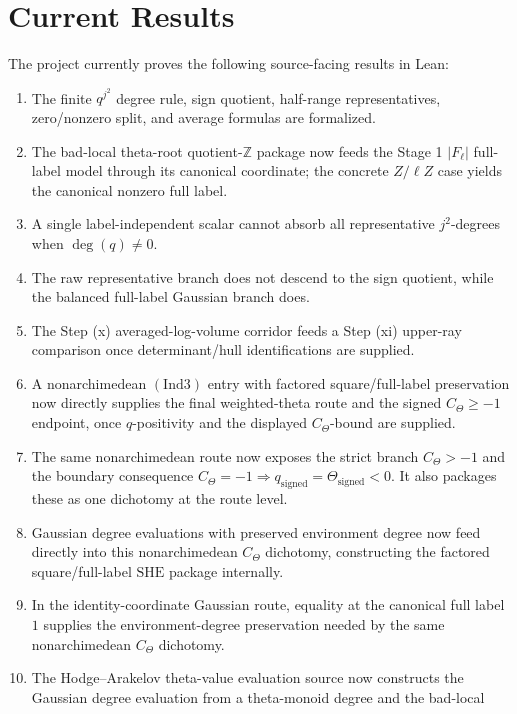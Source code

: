 \documentclass[11pt]{article}
\newcommand{\Lean}{Lean}
\newcommand{\Ind}{\ensuremath{\mathrm{Ind}}}
\newcommand{\SHE}{\ensuremath{\mathrm{SHE}}}
\theoremstyle{plain}
\theoremstyle{definition}
\theoremstyle{remark}
\begin{document}
\section{Current Results}

The project currently proves the following source-facing results in \Lean{}:

\begin{enumerate}
\item The finite \(q^{j^2}\) degree rule, sign quotient, half-range
  representatives, zero/nonzero split, and average formulas are formalized.
\item The bad-local theta-root quotient-\(\mathbb{Z}\) package now feeds the
  Stage 1 \(|F_\ell|\) full-label model through its canonical coordinate; the
  concrete \(Z/\ell Z\) case yields the canonical nonzero full label.
\item A single label-independent scalar cannot absorb all representative
  \(j^2\)-degrees when \(\deg(q)\ne0\).
\item The raw representative branch does not descend to the sign quotient,
  while the balanced full-label Gaussian branch does.
\item The Step (x) averaged-log-volume corridor feeds a Step (xi) upper-ray
  comparison once determinant/hull identifications are supplied.
\item A nonarchimedean \((\Ind3)\) entry with factored square/full-label
  preservation now directly supplies the final weighted-theta route and the
  signed \(C_\Theta\ge-1\) endpoint, once \(q\)-positivity and the displayed
  \(C_\Theta\)-bound are supplied.
\item The same nonarchimedean route now exposes the strict branch
  \(C_\Theta>-1\) and the boundary consequence
  \(C_\Theta=-1\Rightarrow q_{\mathrm{signed}}=\Theta_{\mathrm{signed}}<0\).
  It also packages these as one dichotomy at the route level.
\item Gaussian degree evaluations with preserved environment degree now feed
  directly into this nonarchimedean \(C_\Theta\) dichotomy, constructing the
  factored square/full-label \SHE{} package internally.
\item In the identity-coordinate Gaussian route, equality at the canonical full
  label \(1\) supplies the environment-degree preservation needed by the same
  nonarchimedean \(C_\Theta\) dichotomy.
\item The Hodge--Arakelov theta-value evaluation source now constructs the
  Gaussian degree evaluation from a theta-monoid degree and the bad-local

\end{enumerate}
\end{document}
